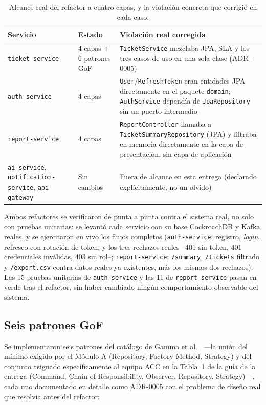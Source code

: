 \begin{table}[H]
\centering
\small
\caption{Alcance real del refactor a cuatro capas, y la violación concreta que corrigió en cada
caso.}
\label{tab:hexagonal-alcance}
\begin{tabular}{@{}p{2.9cm}p{4.6cm}p{6.0cm}@{}}
\toprule
\textbf{Servicio} & \textbf{Estado} & \textbf{Violación real corregida} \\
\midrule
\texttt{ticket-service} & 4 capas + 6 patrones GoF & \texttt{TicketService} mezclaba JPA, SLA y
  los tres casos de uso en una sola clase (ADR-0005) \\
\texttt{auth-service} & 4 capas & \texttt{User}/\texttt{RefreshToken} eran entidades JPA
  directamente en el paquete \texttt{domain}; \texttt{AuthService} dependía de
  \texttt{JpaRepository} sin un puerto intermedio \\
\texttt{report-service} & 4 capas & \texttt{ReportController} llamaba a
  \texttt{TicketSummaryRepository} (JPA) y filtraba en memoria directamente en la capa de
  presentación, sin capa de aplicación \\
\texttt{ai-service}, \texttt{notification-service}, \texttt{api-gateway} & Sin cambios &
  Fuera de alcance en esta entrega (declarado explícitamente, no un olvido) \\
\bottomrule
\end{tabular}
\end{table}

Ambos refactores se verificaron de punta a punta contra el sistema real, no solo con pruebas
unitarias: se levantó cada servicio con su base CockroachDB y Kafka reales, y se ejercitaron en
vivo los flujos completos (\texttt{auth-service}: registro, \emph{login}, refresco con rotación
de token, y los tres rechazos reales --401 sin token, 401 credenciales inválidas, 403 sin rol--;
\texttt{report-service}: \texttt{/summary}, \texttt{/tickets} filtrado y \texttt{/export.csv}
contra datos reales ya existentes, más los mismos dos rechazos). Las 15 pruebas unitarias de
\texttt{auth-service} y las 11 de \texttt{report-service} pasan en verde tras el refactor, sin
haber cambiado ningún comportamiento observable del sistema.

\subsection{Seis patrones GoF}
\label{sec:gof-e4}

Se implementaron seis patrones del catálogo de Gamma et al.~\cite{gamma1994patterns} —la unión
del mínimo exigido por el Módulo A (Repository, Factory Method, Strategy) y del conjunto
asignado específicamente al equipo ACC en la Tabla~1 de la guía de la entrega (Command, Chain of
Responsibility, Observer, Repository, Strategy)—, cada uno documentado en detalle como
\href{run:../adr/0005-patrones-gof.md}{ADR-0005} con el problema de diseño real que resolvía
antes del refactor:

